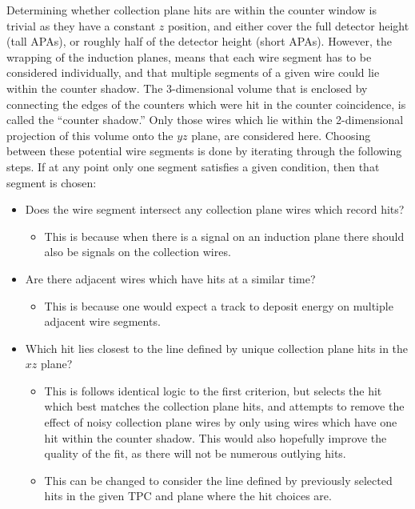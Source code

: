 Determining whether collection plane hits are within the counter window is trivial as they have a constant $z$ position, and either cover the full detector height (tall APAs), or roughly half of the detector height (short APAs). However, the wrapping of the induction planes, means that each wire segment has to be considered individually, and that multiple segments of a given wire could lie within the counter shadow. The 3-dimensional volume that is enclosed by connecting the edges of the counters which were hit in the counter coincidence, is called the ``counter shadow.'' Only those wires which lie within the 2-dimensional projection of this volume onto the $yz$ plane, are considered here. Choosing between these potential wire segments is done by iterating through the following steps. If at any point only one segment satisfies a given condition, then that segment is chosen:
\begin{itemize}
\item Does the wire segment intersect any collection plane wires which record hits?
  \begin{itemize}
  \item This is because when there is a signal on an induction plane there should also be signals on the collection wires.
  \end{itemize}
\item Are there adjacent wires which have hits at a similar time?
  \begin{itemize}
  \item This is because one would expect a track to deposit energy on multiple adjacent wire segments. 
  \end{itemize}
\item Which hit lies closest to the line defined by unique collection plane hits in the $xz$ plane?
  \begin{itemize}
  \item This is follows identical logic to the first criterion, but selects the hit which best matches the collection plane hits, and attempts to remove the effect of noisy collection plane wires by only using wires which have one hit within the counter shadow. This would also hopefully improve the quality of the fit, as there will not be numerous outlying hits.
  \item This can be changed to consider the line defined by previously selected hits in the given TPC and plane where the hit choices are.
  \end{itemize}
\end{itemize}

